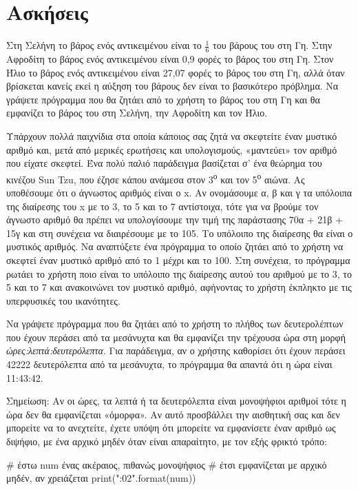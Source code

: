 \documentclass[a4paper,11pt,oneside]{book}
\begin{document}
\section{Ασκήσεις}

\begin{exercise}
Στη Σελήνη το βάρος ενός αντικειμένου είναι το $\frac{1}{6}$ του βάρους του στη Γη.
Στην Αφροδίτη το βάρος ενός αντικειμένου είναι 0,9 φορές το βάρος του στη Γη. 
Στον Ήλιο το βάρος ενός αντικειμένου είναι 27,07 φορές το βάρος του στη Γη, αλλά όταν βρίσκεται κανείς εκεί η αύξηση του βάρους δεν είναι το βασικότερο πρόβλημα.
Να γράψετε πρόγραμμα που θα ζητάει από το χρήστη το βάρος του στη Γη και θα εμφανίζει το βάρος του στη Σελήνη, την Αφροδίτη και τον Ήλιο. 
\end{exercise}

\begin{exercise} %
Υπάρχουν πολλά παιχνίδια στα οποία κάποιος σας ζητά να σκεφτείτε έναν μυστικό αριθμό και, μετά από μερικές ερωτήσεις και υπολογισμούς, «μαντεύει» τον αριθμό που είχατε σκεφτεί. Ένα πολύ παλιό παράδειγμα βασίζεται σ' ένα θεώρημα του κινέζου Sun Tzu, που έζησε κάπου ανάμεσα στον 3\textsuperscript{ο} και τον 5\textsuperscript{ο} αιώνα. Ας υποθέσουμε ότι ο άγνωστος αριθμός είναι ο x. Αν ονομάσουμε α, β και γ τα υπόλοιπα της διαίρεσης του x με το 3, το 5 και το 7 αντίστοιχα, τότε για να βρούμε τον άγνωστο αριθμό θα πρέπει να υπολογίσουμε την τιμή της παράστασης 70α + 21β + 15γ και στη συνέχεια να διαιρέσουμε με το 105. Το υπόλοιπο της διαίρεσης θα είναι ο μυστικός αριθμός. Να αναπτύξετε ένα πρόγραμμα το οποίο ζητάει από το χρήστη να σκεφτεί έναν μυστικό αριθμό από το 1 μέχρι και το 100. Στη συνέχεια, το πρόγραμμα ρωτάει το χρήστη ποιο είναι το υπόλοιπο της διαίρεσης αυτού του αριθμού με το 3, το 5 και το 7 και ανακοινώνει τον μυστικό αριθμό, αφήνοντας το χρήστη έκπληκτο με τις υπερφυσικές του ικανότητες.
\end{exercise}

\begin{exercise}
\marginnote[18pt]{
}Να γράψετε πρόγραμμα που θα ζητάει από το χρήστη το πλήθος των δευτερολέπτων που έχουν περάσει από τα μεσάνυχτα και θα εμφανίζει την τρέχουσα ώρα στη μορφή \emph{ώρες:λεπτά:δευτερόλεπτα}. Για παράδειγμα, αν ο χρήστης καθορίσει ότι έχουν περάσει 42222 δευτερόλεπτα από τα μεσάνυχτα, το πρόγραμμα θα απαντά ότι η ώρα είναι 11:43:42.

\begin{note}
Σημείωση: Αν οι ώρες, τα λεπτά ή τα δευτερόλεπτα είναι μονοψήφιοι αριθμοί τότε η ώρα δεν θα εμφανίζεται «όμορφα». Αν αυτό προσβάλλει την αισθητική σας και δεν μπορείτε να το ανεχτείτε, έχετε υπόψη ότι μπορείτε να εμφανίσετε έναν αριθμό ως διψήφιο, με ένα αρχικό μηδέν όταν είναι απαραίτητο, με τον εξής φρικτό τρόπο:

\begin{pycode}
# έστω num ένας ακέραιος, πιθανώς μονοψήφιος
# έτσι εμφανίζεται με αρχικό μηδέν, αν χρειάζεται
print("{:02}".format(num))
\end{pycode}
\end{note}
\end{exercise}
\end{document}
